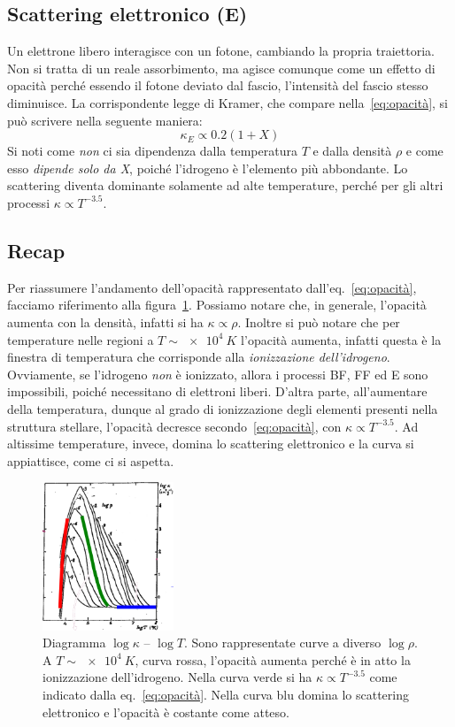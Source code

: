 \subsection{Scattering elettronico (E)}\label{sec:electron-scattering}
Un elettrone libero interagisce con un fotone, cambiando la propria traiettoria. Non si tratta di un reale assorbimento, ma agisce comunque come un effetto di opacità perché essendo il fotone deviato dal fascio, l'intensità del fascio stesso diminuisce. La corrispondente legge di Kramer, che compare nella~\eqref{eq:opacità}, si può scrivere nella seguente maniera:
\begin{equation}
    \kappa_E \propto 0.2(1+X)
\end{equation}
Si noti come \emph{non} ci sia dipendenza dalla temperatura $T$ e dalla densità $\rho$ e come esso \emph{dipende solo da X}, poiché l'idrogeno è l'elemento più abbondante. Lo scattering diventa dominante solamente ad alte temperature, perché per gli altri processi $\kappa \propto T^{-3.5}$.

\subsection{Recap}
Per riassumere l'andamento dell'opacità rappresentato dall'eq.~\eqref{eq:opacità}, facciamo riferimento alla figura~\ref{fig:opacità}. Possiamo notare che, in generale, l'opacità aumenta con la densità, infatti si ha $\kappa \propto \rho$. Inoltre si può notare che per temperature nelle regioni a $T \sim \SI{e4}{K}$ l'opacità aumenta, infatti questa è la finestra di temperatura che corrisponde alla \emph{ionizzazione dell'idrogeno}. Ovviamente, se l'idrogeno \emph{non} è ionizzato, allora i processi BF, FF ed E sono impossibili, poiché necessitano di elettroni liberi. D'altra parte, all'aumentare della temperatura, dunque al grado di ionizzazione degli elementi presenti nella struttura stellare, l'opacità decresce secondo~\eqref{eq:opacità}, con $\kappa \propto T^{-3.5}$. Ad altissime temperature, invece, domina lo scattering elettronico e la curva si appiattisce, come ci si  aspetta.

\begin{figure}
    \centering
    \includegraphics[width=0.35\textwidth]{immagini/opacita.png}
    \caption{Diagramma $\log \kappa$ -- $\log T$. Sono rappresentate curve a diverso $\log \rho$. A $T \sim \SI{e4}{K}$, curva rossa, l'opacità aumenta perché è in atto la ionizzazione dell'idrogeno. Nella curva verde si ha $\kappa \propto T^{-3.5}$ come indicato dalla eq.~\eqref{eq:opacità}. Nella curva blu domina lo scattering elettronico e l'opacità è costante come atteso.}
    \label{fig:opacità}
\end{figure}